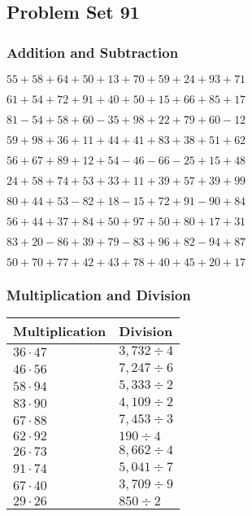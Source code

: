 \hypertarget{problem-set-91}{%
\subsection{Problem Set 91}\label{problem-set-91}}

\hypertarget{addition-and-subtraction}{%
\subsubsection{Addition and
Subtraction}\label{addition-and-subtraction}}

\(55+58+64+50+13+70+59+24+93+71\)

\(61+54+72+91+40+50+15+66+85+17\)

\(81-54+58+60-35+98+22+79+60-12\)

\(59+98+36+11+44+41+83+38+51+62\)

\(56+67+89+12+54-46-66-25+15+48\)

\(24+58+74+53+33+11+39+57+39+99\)

\(80+44+53-82+18-15+72+91-90+84\)

\(56+44+37+84+50+97+50+80+17+31\)

\(83+20-86+39+79-83+96+82-94+87\)

\(50+70+77+42+43+78+40+45+20+17\)

\hypertarget{multiplication-and-division}{%
\subsubsection{Multiplication and
Division}\label{multiplication-and-division}}

\begin{longtable}[]{@{}ll@{}}
\toprule
Multiplication & Division\tabularnewline
\midrule
\endhead
\(36\cdot47\) & \(3,732 ÷4\)\tabularnewline
\(46\cdot56\) & \(7,247÷6\)\tabularnewline
\(58\cdot94\) & \(5,333÷2\)\tabularnewline
\(83\cdot90\) & \(4,109÷2\)\tabularnewline
\(67\cdot88\) & \(7,453÷3\)\tabularnewline
\(62\cdot92\) & \(190÷4\)\tabularnewline
\(26\cdot73\) & \(8,662÷4\)\tabularnewline
\(91\cdot74\) & \(5,041÷7\)\tabularnewline
\(67\cdot40\) & \(3,709÷9\)\tabularnewline
\(29\cdot26\) & \(850÷2\)\tabularnewline
\bottomrule
\end{longtable}
